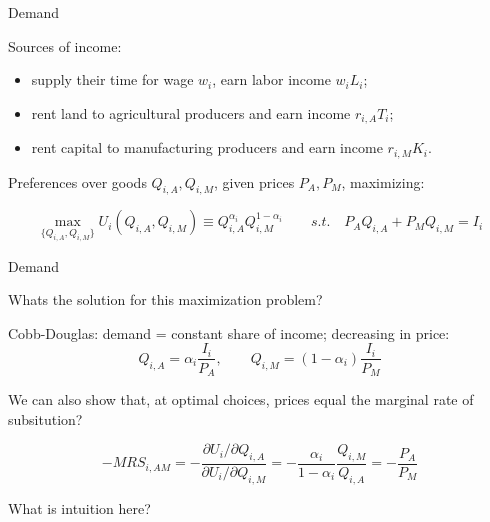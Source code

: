 \documentclass[notes,11pt, aspectratio=169, xcolor=table]{beamer}
\newenvironment{wideitemize}{\itemize\addtolength{\itemsep}{10pt}}{\enditemize}
\begin{document}
\begin{frame}{Demand}
\begin{wideitemize}
    \item Sources of income:
    \begin{itemize}
        \item<2-> supply their time for wage $w_i$, earn labor income $w_i L_i$;
        \item<3-> rent land to agricultural producers and earn income $r_{i,A} T_{i}$;
        \item<4-> rent capital to manufacturing producers and earn income $r_{i,M} K_{i}$.
    \end{itemize}
    \item<6-> Preferences over goods $Q_{i,A}, Q_{i,M}$, given prices $P_{A}, P_{M}$, maximizing:
    
    \begin{equation*}
        \max_{\{Q_{i,A}, Q_{i,M}\}} U_i(Q_{i,A}, Q_{i,M}) \equiv Q_{i,A}^{\alpha_i} Q_{i,M}^{1-\alpha_i} \qquad s.t. \quad P_{A} Q_{i,A} + P_{M} Q_{i,M} = I_i
    \end{equation*}
    
\end{wideitemize}
    
\end{frame}


\begin{frame}{Demand}
\begin{wideitemize}
    \item Whats the solution for this maximization problem?
    
    \item<2-> Cobb-Douglas: demand = constant share of income; decreasing in price:
    \begin{equation*}\label{eq: demand}
    Q_{i,A} = \alpha_i  \frac{I_i}{P_{A}}, \qquad Q_{i,M} = (1-\alpha_i) \frac{I_i}{P_{M}}
    \end{equation*}

    \item<3-> We can also show that, at optimal choices, prices equal the marginal rate of subsitution?

    \begin{equation}
        -MRS_{i,AM} = -\frac{\partial U_i / \partial Q_{i,A} }{ \partial U_i / \partial Q_{i,M} } = -\frac{\alpha_i}{1-\alpha_i} \frac{Q_{i,M}}{Q_{i,A}} = -\frac{P_A}{P_M}
    \end{equation}

    \item<4-> What is intuition here?
    
\end{wideitemize}
    
\end{frame}
\end{document}
